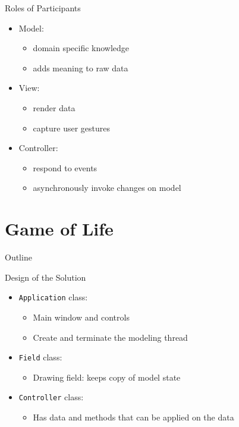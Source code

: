 \begin{frame}{Roles of Participants}
  \begin{itemize}
  \item Model:
    \begin{itemize}
    \item domain specific knowledge
    \item adds meaning to raw data
    \end{itemize}
  \item View:
    \begin{itemize}
    \item render data
    \item capture user gestures
    \end{itemize}
  \item Controller:
    \begin{itemize}
    \item respond to events 
    \item asynchronously invoke changes on model
    \end{itemize}
  \end{itemize}
\end{frame}

\section{Game of Life}

\begin{frame}{Outline}
  \tableofcontents[current]
\end{frame}

\begin{frame}{Design of the Solution}
  \begin{itemize}
  \item \lstinline!Application! class:
    \begin{itemize}
    \item Main window and controls
    \item Create and terminate the modeling thread
    \end{itemize}
  \item \lstinline!Field! class:
    \begin{itemize}
    \item Drawing field: keeps copy of model state
    \end{itemize}
  \item \lstinline!Controller! class:
    \begin{itemize}
    \item Has data and methods that can be applied on the data
    \end{itemize}
  \end{itemize}
\end{frame}

